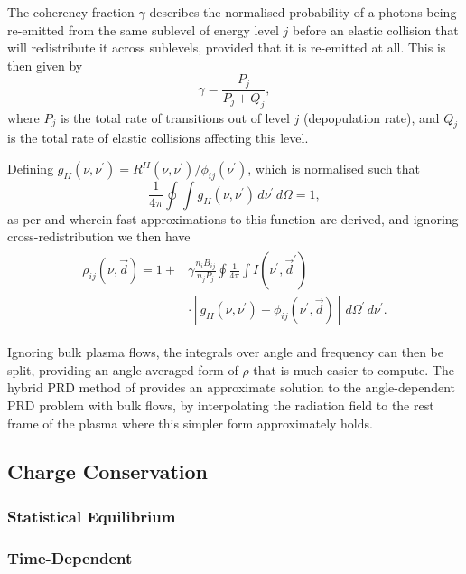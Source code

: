 The coherency fraction $\gamma$ describes the normalised probability of a photons being re-emitted from the same sublevel of energy level $j$ before an elastic collision that will redistribute it across sublevels, provided that it is re-emitted at all.
This is then given by
\begin{equation}
    \gamma = \frac{P_j}{P_j + Q_j},
\end{equation}
where $P_j$ is the total rate of transitions out of level $j$ (depopulation rate), and $Q_j$ is the total rate of elastic collisions affecting this level.

Defining $g_{II}(\nu, \nu^\prime) = R^{II}(\nu, \nu^\prime)/\phi_{ij}(\nu^\prime)$, which is normalised such that
\begin{equation}
    \label{Eq:gIINorm}
    \frac{1}{4\pi}\oint\int g_{II}(\nu, \nu^\prime) \,d\nu^\prime\,d\Omega= 1,
\end{equation}
as per \citet{Gouttebroze1986} and \citet{Uitenbroek1989} wherein fast approximations to this function are derived, and ignoring cross-redistribution we then have
\begin{align}
\begin{split}
    \label{Eq:RhoPrd}
    \rho_{ij}(\nu, \vec{d}) = 1 + & \gamma \frac{n_i B_{ij}}{n_j P_j} \oint \frac{1}{4\pi} \int I(\nu^\prime, \vec{d}^\prime) \\ & \cdot\left[ g_{II}(\nu, \nu^\prime) - \phi_{ij}(\nu^\prime, \vec{d}) \right]\,d\Omega^\prime\,d\nu^\prime.
\end{split}
\end{align}

Ignoring bulk plasma flows, the integrals over angle and frequency can then be split, providing an angle-averaged form of $\rho$ that is much easier to compute. The hybrid PRD method of \citet{Leenaarts2012} provides an approximate solution to the angle-dependent PRD problem with bulk flows, by interpolating the radiation field to the rest frame of the plasma where this simpler form approximately holds.

\subsection{Charge Conservation}
\subsubsection{Statistical Equilibrium}
\subsubsection{Time-Dependent}

